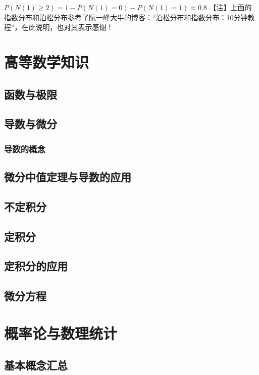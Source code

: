 \documentclass[11pt]{book}
\newcounter{#2}
\newcounter{#2}[#1]
\numberwithin{#2}{#1}
\begin{document}
$ P\left( N\left( 1 \right) \geq 2 \right) =1-P\left( N\left( 1 \right)=0  \right) - P\left( N\left( 1 \right)=1  \right)\approx 0.8 $
【注】上面的指数分布和泊松分布参考了阮一峰大牛的博客：“泊松分布和指数分布：10分钟教程”，在此说明，也对其表示感谢！


\part{高等数学知识}
	\chapter{函数与极限}
	\chapter{导数与微分}
	\section{导数的概念}
	\chapter{微分中值定理与导数的应用}
	\chapter{不定积分}
	\chapter{定积分}
	\chapter{定积分的应用}
	\chapter{微分方程}
	

\part{概率论与数理统计}

	\chapter{基本概念汇总}
\end{document}
